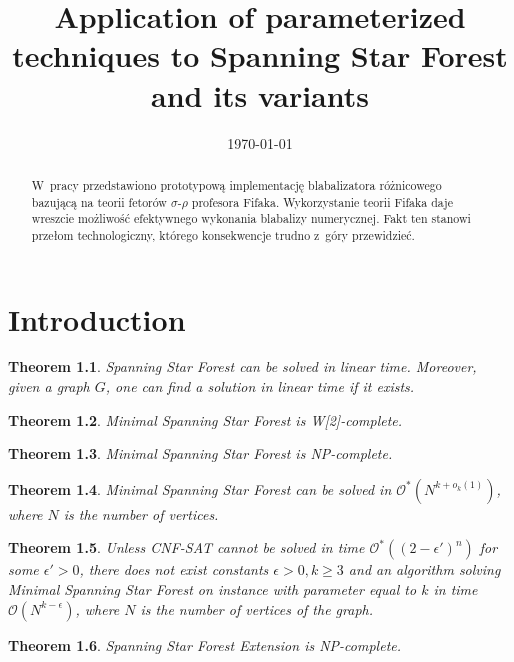 \documentclass[en]{pracamgr}
\title{Application of parameterized techniques to Spanning Star Forest and its variants}
\date{\monthyeardate\today}
\newtheorem{theorem}{Theorem}
\theoremstyle{definition}
\newcommand{\ssfp}{{\sc Spanning Star Forest}}
\newcommand{\mssfp}{{\sc Minimal Spanning Star Forest}}
\newcommand{\ssfep}{{\sc Spanning Star Forest Extension}}
\newcommand{\cnfsat}{{\sc CNF-SAT}}
\begin{document}
\maketitle

\begin{abstract}
  W~pracy przedstawiono prototypową implementację blabalizatora
  różnicowego bazującą na teorii fetorów $\sigma$-$\rho$ profesora
  Fifaka.  Wykorzystanie teorii Fifaka daje wreszcie możliwość
  efektywnego wykonania blabalizy numerycznej.  Fakt ten stanowi
  przełom technologiczny, którego konsekwencje trudno z~góry
  przewidzieć.
\end{abstract}

\tableofcontents

\chapter{Introduction}

\begin{theorem}\label{thm-ssfp}
	\ssfp{} can be solved in linear time. Moreover, given a graph $G$, one can find a solution in linear time if it exists.
\end{theorem}

\begin{theorem}\label{thm-mssfp-w2c}
	\mssfp{} is \textup{W[2]}-complete.
\end{theorem}

\begin{theorem}\label{thm-mssfp-npc}
	\mssfp{} is \textup{NP-complete}.
\end{theorem}

\begin{theorem}\label{thm-mssfp-time}
	\mssfp{} can be solved in $\mathcal{O}^*(N^{k + o_k(1)})$, where $N$ is the number of vertices.
\end{theorem}

\begin{theorem}\label{thm-mssfp-lowerbound}
	Unless \cnfsat{} cannot be solved in time $\mathcal{O}^*((2-\epsilon')^n)$ for some $\epsilon' > 0$, there does not exist constants $\epsilon > 0,k\geq 3$ and an algorithm solving \mssfp{} on instance with parameter equal to $k$ in time $\mathcal{O}(N^{k-\epsilon})$, where $N$ is the number of vertices of the graph.
\end{theorem}

\begin{theorem}\label{thm-ssfep-npc}
	\ssfep{} is \textup{NP}-complete.
\end{theorem}
\end{document}
